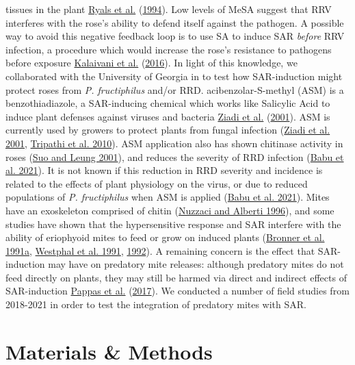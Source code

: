 \documentclass[12pt,final,CPage]{ufthesis}
\begin{document}
{tissues in the plant \protect\hyperlink{ref-Ryals1994}{Ryals et al.} (\protect\hyperlink{ref-Ryals1994}{1994}). Low levels of MeSA suggest that RRV interferes with the rose's ability to defend itself against the pathogen. A possible way to avoid this negative feedback loop is to use SA to induce SAR \emph{before} RRV infection, a procedure which would increase the rose's resistance to pathogens before exposure \protect\hyperlink{ref-Kalaivani2016}{Kalaivani et al.} (\protect\hyperlink{ref-Kalaivani2016}{2016}). In light of this knowledge, we collaborated with the University of Georgia in to test how SAR-induction might protect roses from \emph{P. fructiphilus} and/or RRD. acibenzolar-S-methyl (ASM) is a benzothiadiazole, a SAR-inducing chemical which works like Salicylic Acid to induce plant defenses against viruses and bacteria \protect\hyperlink{ref-Ziadi2001}{Ziadi et al.} (\protect\hyperlink{ref-Ziadi2001}{2001}). ASM is currently used by growers to protect plants from fungal infection (\protect\hyperlink{ref-Ziadi2001}{Ziadi et al. 2001}, \protect\hyperlink{ref-Tripathi2010}{Tripathi et al. 2010}). ASM application also has shown chitinase activity in roses (\protect\hyperlink{ref-Suo2001}{Suo and Leung 2001}), and reduces the severity of RRD infection (\protect\hyperlink{ref-Babu2021}{Babu et al. 2021}). It is not known if this reduction in RRD severity and incidence is related to the effects of plant physiology on the virus, or due to reduced populations of \emph{P. fructiphilus} when ASM is applied (\protect\hyperlink{ref-Babu2021}{Babu et al. 2021}). Mites have an exoskeleton comprised of chitin (\protect\hyperlink{ref-Nuzzaci1996a}{Nuzzaci and Alberti 1996}), and some studies have shown that the hypersensitive response and SAR interfere with the ability of eriophyoid mites to feed or grow on induced plants (\protect\hyperlink{ref-Bronner1991a}{Bronner et al. 1991a}, \protect\hyperlink{ref-Westphal1991}{Westphal et al. 1991}, \protect\hyperlink{ref-Westphal1992}{1992}). A remaining concern is the effect that SAR-induction may have on predatory mite releases: although predatory mites do not feed directly on plants, they may still be harmed via direct and indirect effects of SAR-induction \protect\hyperlink{ref-Pappas2017}{Pappas et al.} (\protect\hyperlink{ref-Pappas2017}{2017}). We conducted a number of field studies from 2018-2021 in order to test the integration of predatory mites with SAR.

  \hypertarget{mm-asm-ipm}{%
  \section{Materials \& Methods}\label{mm-asm-ipm}}

}
\end{document}
